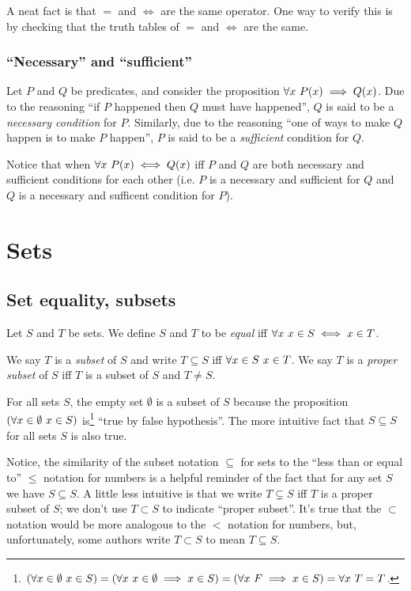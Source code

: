 A neat fact is that $=$ and $\iff$ are the same operator. One way to verify this is by checking that the truth tables of $=$ and $\iff$ are the same.

\subsubsection*{``Necessary'' and ``sufficient''}

Let $P$ and $Q$ be predicates, and consider the proposition $\forall x \text{ } P(x) \implies Q(x)$. Due to the reasoning ``if $P$ happened then $Q$ must have happened'', $Q$ is said to be a \textit{necessary condition} for $P$. Similarly, due to the reasoning ``one of ways to make $Q$ happen is to make $P$ happen'', $P$ is said to be a \textit{sufficient} condition for $Q$. 

Notice that when $\forall x \text{ } P(x) \iff Q(x)$ iff $P$ and $Q$ are both necessary and sufficient conditions for each other (i.e. $P$ is a necessary and sufficient for $Q$ and $Q$ is a necessary and sufficent condition for $P$).

\section{Sets}

\subsection*{Set equality, subsets}

Let $S$ and $T$ be sets. We define $S$ and $T$ to be \textit{equal} iff $\forall x \text{ } x \in S \iff x \in T$.

We say $T$ is a \textit{subset} of $S$ and write $T \subseteq S$ iff $\forall x \in S \text{ } x \in T$. We say $T$ is a \textit{proper subset} of $S$ iff $T$ is a subset of $S$ and $T \neq S$.

For all sets $S$, the empty set $\emptyset$ is a subset of $S$ because the proposition $(\forall x \in \emptyset \text{ } x \in S)$ is\footnote{$(\forall x \in \emptyset \text{ } x \in S) = (\forall x \text{ } x \in \emptyset \implies x \in S) = (\forall x \text{ } F \implies x \in S) = \forall x \text{ } T = T$.} ``true by false hypothesis''. The more intuitive fact that $S \subseteq S$ for all sets $S$ is also true.

Notice, the similarity of the subset notation $\subseteq$ for sets to the ``less than or equal to'' $\leq$ notation for numbers is a helpful reminder of the fact that for any set $S$ we have $S \subseteq S$. A little less intuitive is that we write $T \subsetneq S$ iff $T$ is a proper subset of $S$; we don't use $T \subset S$ to indicate ``proper subset''. It's true that the $\subset$ notation would be more analogous to the $<$ notation for numbers, but, unfortunately, some authors write $T \subset S$ to mean $T \subseteq S$.

